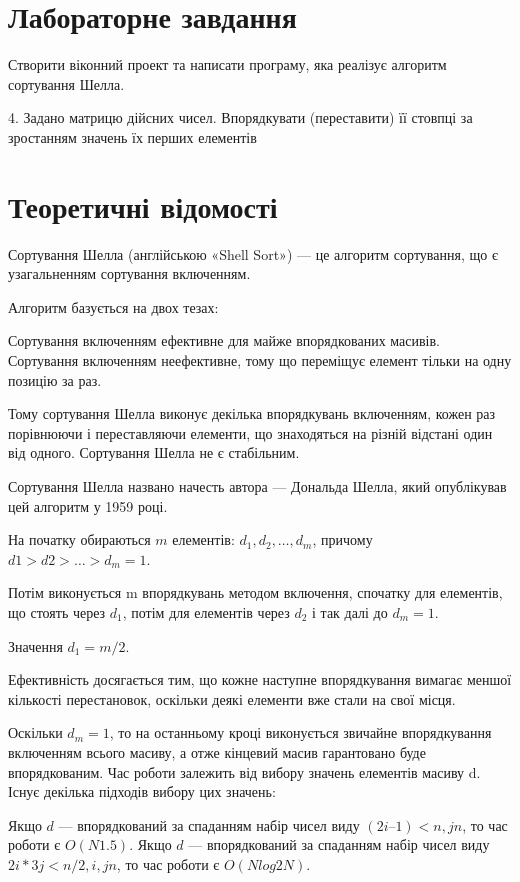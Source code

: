 \documentclass{article}
\begin{document}
\begin{normalsize}
		\section*{Лабораторне завдання}
		Створити віконний проект та написати програму, яка реалізує алгоритм сортування Шелла.
		\begin{center}
			4. Задано матрицю дійсних чисел. Впорядкувати (переставити) її стовпці за зростанням значень їх перших елементів
		\end{center}
		
		\section*{Теоретичні відомості}
		Сортування Шелла (англійською «Shell Sort») — це алгоритм сортування, що є узагальненням сортування включенням.
		
		Алгоритм базується на двох тезах:
		
		Сортування включенням ефективне для майже впорядкованих масивів.
		Сортування включенням неефективне, тому що переміщує елемент тільки на одну позицію за раз.
		
		Тому сортування Шелла виконує декілька впорядкувань включенням, кожен раз порівнюючи і переставляючи елементи, що знаходяться на різній відстані один від одного. Сортування Шелла не є стабільним.
		
		Сортування Шелла названо начесть автора — Дональда Шелла, який опублікував цей алгоритм у 1959 році. 
		
		На початку обираються $m$ елементів: $d_1, d_2, …, d_m$, причому $d1 > d2 > … > d_m = 1$.
		
		Потім виконується m впорядкувань методом включення, спочатку для елементів, що стоять через $d_1$, потім для елементів через $d_2$ і так далі до $d_m = 1$.
		
		Значення   $d_1  = m/2$.
		
		Ефективність досягається тим, що кожне наступне впорядкування вимагає меншої кількості перестановок, оскільки деякі елементи вже стали на свої місця.
		
		Оскільки $d_m = 1$, то на останньому кроці виконується звичайне впорядкування включенням всього масиву, а отже кінцевий масив гарантовано буде впорядкованим. Час роботи залежить від вибору значень елементів масиву d. Існує декілька підходів вибору цих значень:
		
		Якщо $d$ — впорядкований за спаданням набір чисел виду $(2i  – 1) < n, j n$, то час роботи є $O(N1.5)$. Якщо $d$ — впорядкований за спаданням набір чисел виду $2i *3j < n/2, i, j n$, то час роботи є $O(Nlog2N)$.
		

\end{normalsize}
\end{document}
